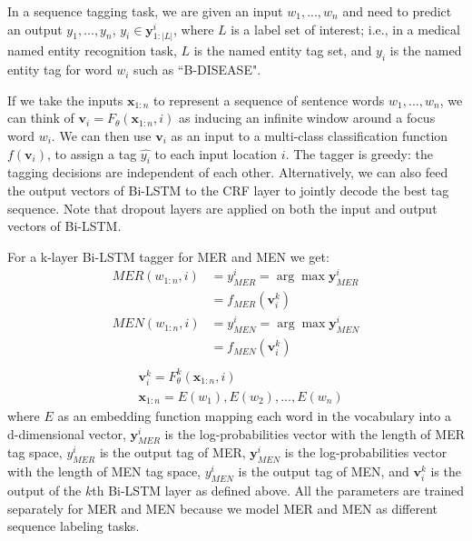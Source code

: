In a sequence tagging task, we are given an input $w_1, ..., w_n$ and need to predict an output
$y_1, ..., y_n$, $y_i \in \mathbf{y}_{1:|L|}^i$, where $L$ is a label set of interest; i.e., in a medical named entity recognition task, $L$ is
the named entity tag set, and $y_i$ is the named entity tag for
word $w_i$ such as ``B-DISEASE".

If we take the inputs $\mathbf{x}_{1:n}$ to represent a sequence of sentence words $w_1, ..., w_n$, we can think of $\mathbf{v}_i = F_{\theta}(\mathbf{x}_{1:n}, i)$ as inducing an infinite window around a focus word $w_i$. We can then use $\mathbf{v}_i$ as an input to a multi-class classification function $f(\mathbf{v}_i)$, to assign a tag $\hat{y_i}$ to each input location $i$. The tagger is greedy: the tagging decisions are independent of each other. Alternatively, we can also feed the output vectors
of Bi-LSTM to the CRF layer to jointly decode the best tag sequence. Note that dropout layers are applied on both the input and output vectors of Bi-LSTM.


For a k-layer Bi-LSTM tagger for MER and MEN we get:
\begin{equation*}
\begin{split}
MER(w_{1:n},i)& = y_{MER}^{i}= \arg\max\mathbf{y}_{MER}^{i}\\
& = f_{MER}(\mathbf{v}_i^k)\\
MEN(w_{1:n},i) &=y_{MEN}^{i}= \arg\max\mathbf{y}_{MEN}^{i}\\
& = f_{MEN}(\mathbf{v}_i^k)\\
\end{split}
\end{equation*}
\vspace{-0.2in}
\begin{equation*}
\begin{split}
&\mathbf{v}_i^k = F_{\theta}^k(\mathbf{x}_{1:n},i)\\
&\mathbf{x}_{1:n} = E(w_1), E(w_2), ..., E(w_n)
\end{split}
\end{equation*}
where $E$ as an embedding function mapping each
word in the vocabulary into a d-dimensional
vector, $\mathbf{y}_{MER}^{i}$ is the log-probabilities vector with the length of MER tag space, $y_{MER}^{i}$ is the output tag of MER, $\mathbf{y}_{MEN}^{i}$ is the log-probabilities vector with the length of MEN tag space, $y_{MEN}^{i}$ is the output tag of MEN, 
and $\mathbf{v}_i^k$ is the output of the $k$th Bi-LSTM layer
as defined above. All the parameters are trained separately for MER and MEN because we model MER and MEN as different sequence labeling tasks.

